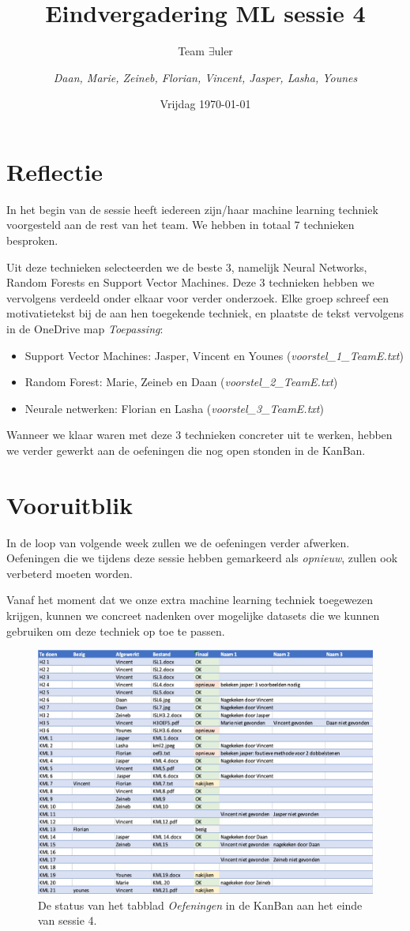 \documentclass{article}
\title{Eindvergadering ML sessie 4}
\author{Team $\exists$uler \and
	\textit{Daan, Marie, Zeineb, Florian, Vincent, Jasper, Lasha, Younes}}
\date{Vrijdag \today}
\begin{document}
	
\maketitle

\section*{Reflectie}

In het begin van de sessie heeft iedereen zijn/haar machine learning techniek voorgesteld aan de rest van het team. We hebben in totaal 7 technieken besproken.

Uit deze technieken selecteerden we de beste 3, namelijk Neural Networks, Random Forests en Support Vector Machines. Deze 3 technieken hebben we vervolgens verdeeld onder elkaar voor verder onderzoek. Elke groep schreef een motivatietekst bij de aan hen toegekende techniek, en plaatste de tekst vervolgens in de OneDrive map \textit{Toepassing}:

\begin{itemize}
	\item Support Vector Machines: Jasper, Vincent en Younes (\textit{voorstel\_1\_TeamE.txt})
	\item Random Forest: Marie, Zeineb en Daan (\textit{voorstel\_2\_TeamE.txt})
	\item Neurale netwerken: Florian en Lasha (\textit{voorstel\_3\_TeamE.txt})
\end{itemize}

Wanneer we klaar waren met deze 3 technieken concreter uit te werken, hebben we verder gewerkt aan de oefeningen die nog open stonden in de KanBan.

\section*{Vooruitblik}

In de loop van volgende week zullen we de oefeningen verder afwerken. Oefeningen die we tijdens deze sessie hebben gemarkeerd als \textit{opnieuw}, zullen ook verbeterd moeten worden.

Vanaf het moment dat we onze extra machine learning techniek toegewezen krijgen, kunnen we concreet nadenken over mogelijke datasets die we kunnen gebruiken om deze techniek op toe te passen.

\begin{figure}
	\centering
	\includegraphics[width=12cm]{kanban}
	\caption{De status van het tabblad \textit{Oefeningen} in de KanBan aan het einde van sessie 4.}
	\label{fig:kanban}
\end{figure}
\end{document}
